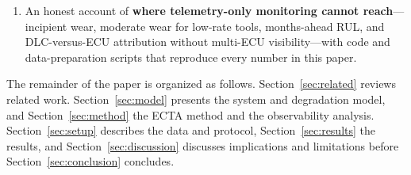 \begin{enumerate}
  moderate wear (1.5--6\,$\Omega$) and confirms it within two minutes of
  driving; for low-rate polling tools, excitation coherence is what separates
  wear from its look-alikes, and a fleet-scale study in which each VED
  vehicle's connector wears with its own recorded year of usage yields early
  warnings with a 1.5\% false-alarm rate.
\item An honest account of \textbf{where telemetry-only monitoring cannot
  reach}---incipient wear, moderate wear for low-rate tools, months-ahead RUL,
  and DLC-versus-ECU attribution without multi-ECU visibility---with code
  and data-preparation scripts that reproduce every number in this paper.
\end{enumerate}

The remainder of the paper is organized as follows.
Section~\ref{sec:related} reviews related work. Section~\ref{sec:model}
presents the system and degradation model, and Section~\ref{sec:method} the
ECTA method and the observability analysis. Section~\ref{sec:setup}
describes the data and protocol, Section~\ref{sec:results} the results, and
Section~\ref{sec:discussion} discusses implications and limitations before
Section~\ref{sec:conclusion} concludes.
